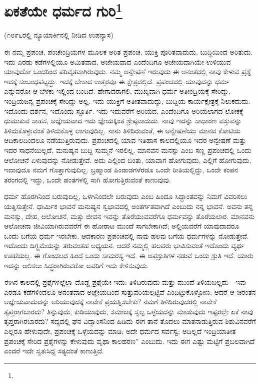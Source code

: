 
\chapter[ಏಕತೆಯೇ ಧರ್ಮದ ಗುರಿ]{ಏಕತೆಯೇ ಧರ್ಮದ ಗುರಿ\protect\footnote{}}

\begin{center}
(೧೮೯೬ರಲ್ಲಿ ನ್ಯೂಯಾರ್ಕಿನಲ್ಲಿ ನೀಡಿದ ಉಪನ್ಯಾಸ)
\end{center}

ಈ ನಮ್ಮ ಪ್ರಪಂಚ, ಪಂಚೇಂದ್ರಿಯಗಳ ಮೂಲಕ ಅರಿತ ಪ್ರಪಂಚ, ಯುಕ್ತಿ ಪೂರಿತವಾದುದು, ಬುದ್ಧಿಯಿಂದ ಅರಿತುದು. ಇದು ಎರಡು ಕಡೆಗಳಲ್ಲಿಯೂ ಅಮಿತವಾದ, ಅಜೇಯವಾದ ಎಂದೆಂದಿಗೂ ಅಜೇಯವಾಗಿಯೇ ಉಳಿಯುವ ಯಾವುದೋ ಒಂದರಿಂದ ಪರಿವೃತವಾಗಿರುವುದು. ನಮ್ಮ ಅನ್ವೇಷಣೆ ಇರುವುದು ಈ ಅನಂತದಲ್ಲಿ ನಾವು ಕೇಳುವ ಪ್ರಶ್ನೆ ಇದಕ್ಕೆ ಸಂಬಂಧಪಟ್ಟದ್ದು. ಇದಕ್ಕೆ ಬೇಕಾದ ಉತ್ತರವೂ ಈ ಕ್ಷೇತ್ರದಲ್ಲಿದೆ. ಪ್ರಪಂಚದಲ್ಲಿ ಯಾವುದನ್ನು ಧರ್ಮ ಎನ್ನುವರೋ ಆ ಬೆಳಕು ಇಲ್ಲಿಂದ ಬಂದಿದೆ. ಹೇಗಾದರಾಗಲಿ, ಮುಖ್ಯವಾಗಿ ಧರ್ಮ ಅತೀಂದ್ರಿಯಕ್ಕೆ ಸೇರಿದ್ದು, ಇಂದ್ರಿಯಜನ್ಯ ಪ್ರಪಂಚಕ್ಕೆ ಸೇರಿದ್ದು ಅಲ್ಲ. ಇದು ಯುಕ್ತಿಗೆ ಅತೀತವಾದುದ್ದು, ಬುದ್ದಿಯ ಕಾರ್ಯಕ್ಷೇತ್ರಕ್ಕೆ ನಿಲುಕದುದು. ಇದೊಂದು ದರ್ಶನ, ಇದೊಂದು ಸ್ಫೂರ್ತಿ. ಇದು ಇದುವರೆಗೆ ಅರಿಯದ, ಎಂದೆಂದಿಗೂ ಅರಿಯಲಾಗದ ಲೋಕಕ್ಕೆ ಧುಮುಕುವ ಸಾಹಸ, ಅಜ್ಞೇಯವಾದ ಇದು ಜ್ಞೇಯಕ್ಕಿಂತ ಶ್ರೇಷ್ಠವಾದುದು. ನಾವು ಇದನ್ನು ಸಾಧಾರಣ ವಸ್ತುವನ್ನು ತಿಳಿದುಕೊಳ್ಳುವಂತೆ ತಿಳಿದುಕೊಳ್ಳ ಲಾಗುವುದಿಲ್ಲ. ನಾನು ತಿಳಿದಿರುವಂತೆ, ಈ ಅನ್ವೇಷಣೆಯು ಮಾನವ ಕೋಟಿಯ ಆದಿಕಾಲದಿಂದಲೂ ನಡೆಯುತ್ತಿರುವುದು. ಪ್ರಪಂಚದಲ್ಲಿ ಯಾವ ಇತಿಹಾಸ ಕಾಲದಲ್ಲಿಯೂ ಇದರ ಅನ್ವೇಷಣೆ ಮತ್ತು ಇದರ ಸಾಧನೆಯಿಲ್ಲದೆ, ಮನುಷ್ಯನ ಬುದ್ದಿ ಸುಮ್ಮನೆ ಇರಲಿಲ್ಲ. ಮಾನವನ ಮನಸ್ಸು ಎಂಬ ಸಣ್ಣ ಪ್ರಪಂಚದಲ್ಲಿ ಒಂದು ಆಲೋಚನೆ ಏಳುವುದನ್ನು ನೋಡುತ್ತೇವೆ. ಅದು ಎಲ್ಲಿಂದ ಬಂತು, ಯಾವಾಗ ಹೋಗುವುದು, ಎಲ್ಲಿಗೆ ಹೋಗುವುದು, ಇದಾವುದೂ ನಮಗೆ ಗೊತ್ತಾಗುವುದಿಲ್ಲ. ಬ್ರಹ್ಮಾಂಡ ಪಿಂಡಾಡಗಳೆರಡೂ ಒಂದೇ ರೀತಿಯಲ್ಲಿದ್ದು, ಒಂದೇ ಕಂಪನ ತರಂಗದಲ್ಲಿ ಇದ್ದು, ಒಂದೇ ಹಂತಗಳಲ್ಲಿ ಸಾಗಿ ಹೋಗುತ್ತಿರುವಂತೆ ಕಾಣುವುವು.

ಧರ್ಮ ಹೊರಗಿನಿಂದ ಬರುವುದಿಲ್ಲ, ಒಳಗಿನಿಂದಲೇ ಬರುವುದು ಎಂಬ ಹಿಂದೂ ಸಿದ್ದಾಂತವನ್ನು ನಿಮಗೆ ವಿವರಿಸಲು ಯತ್ನಿಸುತ್ತೇನೆ. ಧಾರ್ಮಿಕ ಭಾವನೆ ಮನುಷ್ಯನ ಸ್ವಭಾವದಲ್ಲಿ ಅಂತರ್ಗತವಾಗಿದೆ ಎಂಬುದು ನನ್ನ ಭಾವನೆ. ಅವನು ತನ್ನ ಮನಸ್ಸು, ದೇಹ, ಆಲೋಚನೆ, ಮತ್ತು ಜೀವನ ಇವನ್ನು ತೊರೆಯುವವರೆಗೂ ಧರ್ಮವನ್ನು ತೊರೆಯಲಾರ. ಮಾನವನು ಆಲೋಚನಾ ಜೀವಿಯಾಗಿರುವವರೆಗೆ ಈ ಹೋರಾಟ ಮುಂದೆ ಸಾಗಬೇಕಾಗಿದೆ; ಅಲ್ಲಿಯವರೆಗೆ ಯಾವುದಾದರೂ ಒಂದು ಬಗೆಯ ಧರ್ಮ ಇರಬೇಕು. ಆದಕಾರಣ ಪ್ರಪಂಚದಲ್ಲಿ ನಾವು ಹಲವು ಬಗೆಯ ಧರ್ಮಗಳನ್ನು ನೋಡುತ್ತೇವೆ. ಇದೊಂದು ದಿಗ್ಭ್ರಮೆಯನ್ನು ತರುವಂತಹ ಅಧ್ಯಯನ. ಆದರೆ ನಮ್ಮಲ್ಲಿ ಹಲವರು ಭಾವಿಸುವಂತೆ ಇದೊಂದು ವ್ಯರ್ಥ ಊಹೆಯಲ್ಲ. ಈ ಗೊಂದಲದ ಹಿಂದೆ ಒಂದು ಸಾಮರಸ್ಯ ಇದೆ. ಈ ಅಪಶ್ರುತಿಗಳ ನಡುವೆ ಒಂದು ಶ್ರುತಿ ಇದೆ. ಯಾರು ಇದನ್ನು ಆಲಿಸಲು ಸಿದ್ಧರಾಗಿರುವರೋ ಅವರಿಗೆ ಇದು ಕೇಳಿಸುವುದು.

ಈಗಿನ ಕಾಲದಲ್ಲಿ ಪ್ರಶ್ನೆಗಳಲ್ಲೆಲ್ಲಾ ದೊಡ್ಡ ಪ್ರಶ್ನೆಯೇ ಇದು: ತಿಳಿದಿರುವುದು ಮತ್ತು ಮುಂದೆ ತಿಳಿಯಬಲ್ಲದು - ಇವು ಎರಡೂ ಕಡೆಗಳಿಂದಲೂ ಅನಂತವಾದ ಅಜ್ಞೇಯದಿಂದ ಸುತ್ತುವರಿಯಲ್ಪಟ್ಟಿವೆ ಎಂದಿಟ್ಟುಕೊಳ್ಳೋಣ; ಆದರೆ ಆ ಚಿರಂತನ ಅಜ್ಞೇಯವಾದುದನ್ನು ಅರಿಯುವುದಕ್ಕೆ ನಾವೇಕೆ ಪ್ರಯತ್ನಿಸಬೇಕು? ನಮಗೆ ತಿಳಿದಿರುವುದರಲ್ಲಿ ನಾವೇಕೆ ತೃಪ್ತರಾಗಬಾರದು? ತಿನ್ನುವುದು, ಕುಡಿಯುವುದು, ಸಮಾಜಕ್ಕೆ ಸ್ವಲ್ಪ ಒಳ್ಳೆಯದನ್ನು ಮಾಡುವುದು ಇಷ್ಟರಲ್ಲೇ ಏಕೆ ನಾವು ತೃಪ್ತರಾಗಿರಬಾರದು? ಸದ್ಯದಲ್ಲಿ ಘನ ವಿದ್ವಾಂಸನಿಂದ ಹಿಡಿದು ಈಗ ತಾನೆ ತೊದಲು ಮಾತನಾಡುತ್ತಿರುವ ಶಿಶುವಿನವರೆಗೆ ಎಲ್ಲರೂ ಹೇಳುವುದೇ, ಪ್ರಪಂಚಕ್ಕೆ ಒಳ್ಳೆಯದನ್ನು ಮಾಡಿ; ಅದೇ ಧರ್ಮದ ಸರ್ವಸ್ವ; ಅದಿಲ್ಲದೆ ಇಂದ್ರಿಯಾತೀತ ಪ್ರಪಂಚಕ್ಕೆ ಸೇರಿದ ಪ್ರಶ್ನೆಗಳನ್ನು ಕೇಳುವುದು ವೃಥಾ ಕಾಲಹರಣ'' ಎಂಬುದು. ಇದು ಈಗ ಎಷ್ಟು ಮಟ್ಟಿಗೆ ಪ್ರಬಲವಾಗಿದೆ ಎಂದರೆ ಇದೇ ಸ್ವತಃಸಿದ್ದ ಸತ್ಯದಂತೆ ಕಾಣುತ್ತಿದೆ.

